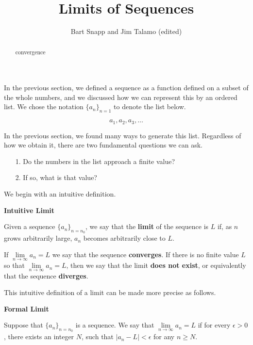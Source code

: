 \documentclass{ximera}
\author{Bart Snapp and Jim Talamo (edited)}
\title{Limits of Sequences}
\begin{document}
\begin{abstract}
convergence
\end{abstract}
\maketitle

In the previous section, we defined a sequence as a function defined on a subset of the whole numbers, and we discussed how we can represent this by an ordered list.  We chose the notation $\{a_n\}_{n=1}$ to denote the list below.

\[
a_1, a_2, a_3 , \ldots
\]

In the previous section, we found many ways to generate this list.  Regardless of how we obtain it, there are two fundamental questions we can ask.
\begin{itemize}
\item[1.] Do the numbers in the list approach a finite value?
\item[2.] If so, what is that value?
\end{itemize}


We begin with an intuitive definition. \\

\begin{definition}  \textbf{\textcolor{green!50!black}{Intuitive Limit}} 


  Given a sequence $\{a_n\}_{n =n_0}$, we say that the \textbf{limit} of the sequence is $L$ if, as $n$ grows arbitrarily large, $a_n$ becomes arbitrarily close to $L$. 
  
If $\lim\limits_{n\to\infty}a_n=L$ we say that the sequence
\textbf{converges}.
If there is no finite value $L$ so that $\lim\limits_{n\to\infty}a_n = L$,
then we say that the limit \textbf{does not exist}, or equivalently that
the sequence \textbf{diverges}.
\end{definition}

This intuitive definition of a limit can be made more precise as follows.

\begin{definition}   \textbf{\textcolor{green!50!black}{Formal Limit}}   

\label{definition:limit-of-a-sequence}
Suppose that $\{a_n\}_{n=n_0}$ is a sequence.  We say that
$\lim\limits_{n\to \infty}a_n=L$ if for every $\epsilon>0$, there exists an integer $N$, such that $|a_n-L|<\epsilon$ for any $n \geq N$.
\end{definition}
\end{document}

